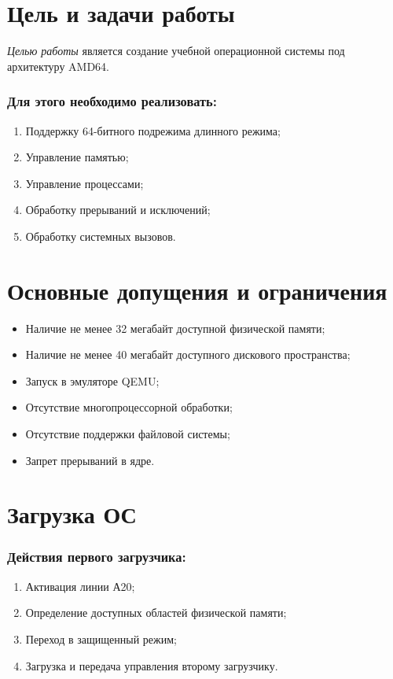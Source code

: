 \documentclass[12pt]{article}
\begin{document}
\TitleSlide

\section{\textbf{Цель и задачи работы}}

\emph{Целью работы} является создание учебной операционной системы под архитектуру AMD64.

\subsubsection{Для этого необходимо реализовать:}

\begin{enumerate}
\item Поддержку 64-битного подрежима длинного режима;
\item Управление памятью;
\item Управление процессами;
\item Обработку прерываний и исключений;
\item Обработку системных вызовов.
\end{enumerate}


\section{\textbf{Основные допущения и ограничения}}
\begin{itemize}
\item Наличие не менее 32 мегабайт доступной физической памяти;
\item Наличие не менее 40 мегабайт доступного дискового пространства;
\item Запуск в эмуляторе QEMU;
\item Отсутствие многопроцессорной обработки;
\item Отсутствие поддержки файловой системы;
\item Запрет прерываний в ядре.
\end{itemize}


\section{\textbf{Загрузка ОС}}
\subsubsection{Действия первого загрузчика:}
\begin{enumerate}
\item Активация линии А20;
\item Определение доступных областей физической памяти;
\item Переход в защищенный режим;
\item Загрузка и передача управления второму загрузчику.
\end{enumerate}
\end{document}
